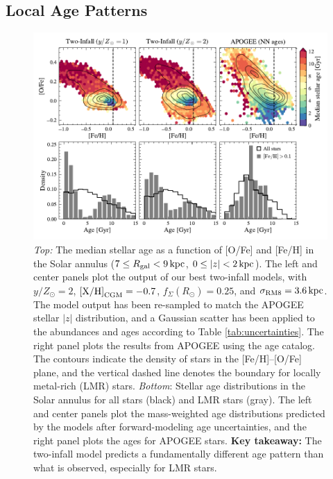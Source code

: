 \documentclass[twocolumn,twocolappendix,linenumbers]{aastex631}
\newcommand{\yZ}[1]{$y/Z_\odot=#1$}
\newcommand{\kpc}{\,{\rm kpc}}
\begin{document}
\subsection{Local Age Patterns}

\begin{figure}
    \centering
    \includegraphics[width=\linewidth]{figures/lmr_ages.pdf}
    \caption{{\it Top:} The median stellar age as a function of [O/Fe] and [Fe/H] in the Solar annulus ($7\leq R_{\rm gal}<9\kpc$, $0\leq|z|<2\kpc$). The left and center panels plot the output of our best two-infall models, with \yZ{2}, ${\rm [X/H]}_{\rm CGM}=-0.7$, $f_\Sigma(R_\odot)=0.25$, and $\sigma_{\rm RM8}=3.6\kpc$. The model output has been re-sampled to match the APOGEE stellar $|z|$ distribution, and a Gaussian scatter has been applied to the abundances and ages according to Table \ref{tab:uncertainties}. The right panel plots the results from APOGEE using the \citet{leung_variational_2023} age catalog. The contours indicate the density of stars in the [Fe/H]--[O/Fe] plane, and the vertical dashed line denotes the boundary for locally metal-rich (LMR) stars.
    {\it Bottom}: Stellar age distributions in the Solar annulus for all stars (black) and LMR stars (gray). The left and center panels plot the mass-weighted age distributions predicted by the models after forward-modeling age uncertainties, and the right panel plots the \citet{leung_variational_2023} ages for APOGEE stars.
    {\bf Key takeaway:} The two-infall model predicts a fundamentally different age pattern than what is observed, especially for LMR stars.}
    \label{fig:lmr-ages}
\end{figure}
\end{document}
